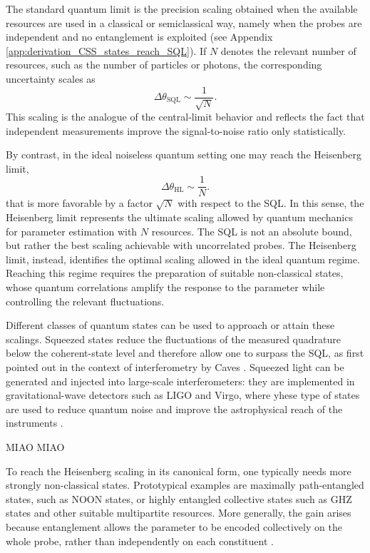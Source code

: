The standard quantum limit is the precision scaling obtained when the available resources are used in a classical or semiclassical way, namely when the probes are independent and no entanglement is exploited (see Appendix \ref{app:derivation_CSS_states_reach_SQL}). If \(N\) denotes the relevant number of resources, such as the number of particles or photons, the corresponding uncertainty scales as
\begin{equation}
	\Delta \theta_{\mathrm{SQL}} \sim \frac{1}{\sqrt{N}}.
	\label{eq:sql_scaling}
\end{equation}
This scaling is the analogue of the central-limit behavior and reflects the fact that independent measurements improve the signal-to-noise ratio only statistically.

By contrast, in the ideal noiseless quantum setting one may reach the Heisenberg limit,
\begin{equation}
	\Delta \theta_{\mathrm{HL}} \sim \frac{1}{N}.
	\label{eq:hl_scaling}
\end{equation}
that is more favorable by a factor \(\sqrt{N}\) with respect to the SQL. In this sense, the Heisenberg limit represents the ultimate scaling allowed by quantum mechanics for parameter estimation with \(N\) resources. The SQL is not an absolute bound, but rather the best scaling achievable with uncorrelated probes. The Heisenberg limit, instead, identifies the optimal scaling allowed in the ideal quantum regime. Reaching this regime requires the preparation of suitable non-classical states, whose quantum correlations amplify the response to the parameter while controlling the relevant fluctuations.

Different classes of quantum states can be used to approach or attain these scalings. Squeezed states reduce the fluctuations of the measured quadrature below the coherent-state level and therefore allow one to surpass the SQL, as first pointed out in the context of interferometry by Caves \cite{Cav81}. Squeezed light can be generated and injected into large-scale interferometers: they are implemented in gravitational-wave detectors such as LIGO and Virgo, where yhese type of states are used to reduce quantum noise and improve the astrophysical reach of the instruments \cite{Ace19}.

MIAO MIAO 

To reach the Heisenberg scaling in its canonical form, one typically needs more strongly non-classical states. Prototypical examples are maximally path-entangled states, such as NOON states, or highly entangled collective states such as GHZ states and other suitable multipartite resources. More generally, the gain arises because entanglement allows the parameter to be encoded collectively on the whole probe, rather than independently on each constituent \cite{GLM04,GLM11}.






